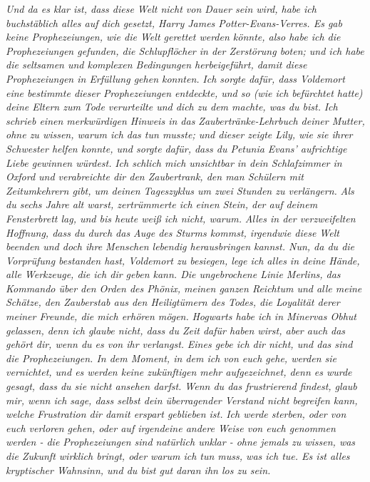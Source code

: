 \emph{Und da es klar ist, dass diese Welt nicht von Dauer sein wird, habe ich buchstäblich alles auf dich gesetzt, Harry James Potter-Evans-Verres. Es gab keine Prophezeiungen, wie die Welt gerettet werden könnte, also habe ich die Prophezeiungen gefunden, die Schlupflöcher in der Zerstörung boten; und ich habe die seltsamen und komplexen Bedingungen herbeigeführt, damit diese Prophezeiungen in Erfüllung gehen konnten.}
\emph{ Ich sorgte dafür, dass Voldemort eine bestimmte dieser Prophezeiungen
entdeckte, und so (wie ich befürchtet hatte) deine Eltern zum Tode verurteilte
und dich zu dem machte, was du bist. }
\emph{Ich schrieb einen merkwürdigen Hinweis in das Zaubertränke-Lehrbuch deiner Mutter, ohne zu wissen, warum ich das tun musste; und dieser zeigte Lily, wie sie ihrer Schwester helfen konnte, und sorgte dafür, dass du Petunia Evans' aufrichtige Liebe gewinnen würdest. }
\emph{Ich schlich mich unsichtbar in dein Schlafzimmer in Oxford und verabreichte dir den Zaubertrank, den man Schülern mit Zeitumkehrern gibt, um deinen Tageszyklus um zwei Stunden zu verlängern. }
\emph{Als du sechs Jahre alt warst, zertrümmerte ich einen Stein, der auf deinem Fensterbrett lag, und bis heute weiß ich nicht, warum.}
\emph{ Alles in der verzweifelten Hoffnung, dass du durch das Auge des Sturms
kommst, irgendwie diese Welt beenden und doch ihre Menschen lebendig
herausbringen kannst. Nun, da du die Vorprüfung bestanden hast, Voldemort zu
besiegen, lege ich alles in deine Hände, alle Werkzeuge, die ich dir geben kann.
Die ungebrochene Linie Merlins, das Kommando über den Orden des Phönix, meinen
ganzen Reichtum und alle meine Schätze, den Zauberstab aus den Heiligtümern des
Todes, die Loyalität derer meiner Freunde, die mich erhören mögen.} \emph{
Hogwarts habe ich in Minervas Obhut gelassen, denn ich glaube nicht, dass du
Zeit dafür haben wirst, aber auch das gehört dir, wenn du es von ihr verlangst.}
\emph{ Eines gebe ich dir nicht, und das sind die Prophezeiungen. In dem Moment,
in dem ich von euch gehe, werden sie vernichtet, und es werden keine zukünftigen
mehr aufgezeichnet, denn es wurde gesagt, dass du sie nicht ansehen darfst. Wenn
du das frustrierend findest, glaub mir, wenn ich sage, dass selbst dein
überragender Verstand nicht begreifen kann, welche Frustration dir damit erspart
geblieben ist.} \emph{ Ich werde sterben, oder von euch verloren gehen, oder auf
irgendeine andere Weise von euch genommen werden - die Prophezeiungen sind
natürlich unklar - ohne jemals zu wissen, was die Zukunft wirklich bringt, oder
warum ich tun muss, was ich tue. Es ist alles kryptischer Wahnsinn, und du bist
gut daran ihn los zu sein. }

